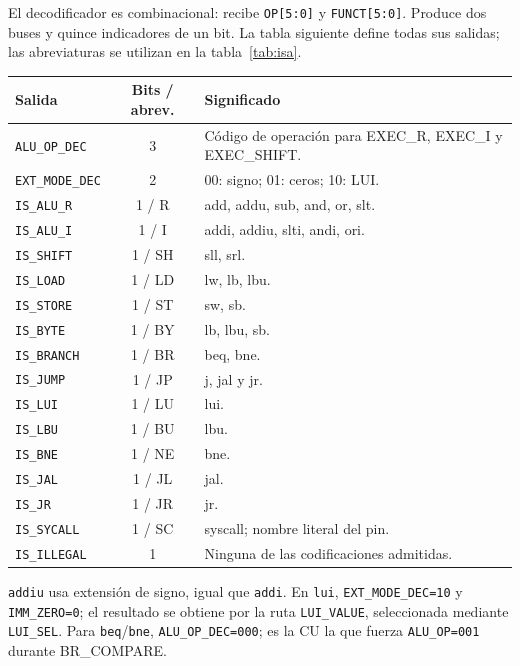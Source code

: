 \documentclass[11pt,a4paper]{article}
\newcommand{\sig}[1]{\texttt{#1}}
\begin{document}
El decodificador es combinacional: recibe \sig{OP[5:0]} y
\sig{FUNCT[5:0]}. Produce dos buses y quince indicadores de un bit. La tabla
siguiente define todas sus salidas; las abreviaturas se utilizan en la
tabla~\ref{tab:isa}.

\begin{center}\small\setlength{\tabcolsep}{4pt}
\begin{tabularx}{\linewidth}{@{}l c X@{}}
\toprule Salida & Bits / abrev. & Significado \\\midrule
\sig{ALU\_OP\_DEC} & 3 & Código de operación para EXEC\_R, EXEC\_I y EXEC\_SHIFT. \\
\sig{EXT\_MODE\_DEC} & 2 & 00: signo; 01: ceros; 10: LUI. \\
\sig{IS\_ALU\_R} & 1 / R & add, addu, sub, and, or, slt. \\
\sig{IS\_ALU\_I} & 1 / I & addi, addiu, slti, andi, ori. \\
\sig{IS\_SHIFT} & 1 / SH & sll, srl. \\
\sig{IS\_LOAD} & 1 / LD & lw, lb, lbu. \\
\sig{IS\_STORE} & 1 / ST & sw, sb. \\
\sig{IS\_BYTE} & 1 / BY & lb, lbu, sb. \\
\sig{IS\_BRANCH} & 1 / BR & beq, bne. \\
\sig{IS\_JUMP} & 1 / JP & j, jal y jr. \\
\sig{IS\_LUI} & 1 / LU & lui. \\
\sig{IS\_LBU} & 1 / BU & lbu. \\
\sig{IS\_BNE} & 1 / NE & bne. \\
\sig{IS\_JAL} & 1 / JL & jal. \\
\sig{IS\_JR} & 1 / JR & jr. \\
\sig{IS\_SYCALL} & 1 / SC & syscall; nombre literal del pin. \\
\sig{IS\_ILLEGAL} & 1 & Ninguna de las codificaciones admitidas. \\
\bottomrule
\end{tabularx}
\end{center}

\sig{addiu} usa extensión de signo, igual que \sig{addi}. En \sig{lui},
\sig{EXT\_MODE\_DEC=10} y \sig{IMM\_ZERO=0}; el resultado se obtiene
por la ruta \sig{LUI\_VALUE}, seleccionada mediante \sig{LUI\_SEL}.
Para \sig{beq}/\sig{bne}, \sig{ALU\_OP\_DEC=000}; es la CU la que fuerza
\sig{ALU\_OP=001} durante BR\_COMPARE.
\end{document}
